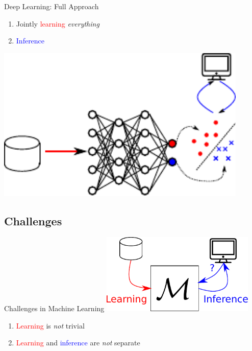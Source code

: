 \documentclass{beamer}
\newcommand{\tred}[1]{\textcolor{red}{#1}}
\newcommand{\tblue}[1]{\textcolor{blue}{#1}}
\begin{document}
\begin{frame}{Deep Learning: Full Approach}
    \raggedright
    \begin{enumerate}
        \item Jointly \tred{learning} \emph{everything}
        \item \tblue{Inference}
    \end{enumerate}

    \vspace{-24mm}
    \begin{center}
    \includegraphics[width=0.9\textwidth]{pipeline3.pdf}
    \end{center}

\end{frame}

\subsection{Challenges}

\begin{frame}{Challenges in Machine Learning}
    \centering
    \includegraphics[width=0.55\textwidth]{machinelearning.pdf}

    \vspace{4mm}
    \raggedright
    \begin{enumerate}
        \item \tred{Learning} is \emph{not} trivial 
        \item \tred{Learning} and \tblue{inference} are \emph{not} separate
    \end{enumerate}
\end{frame}
\end{document}
